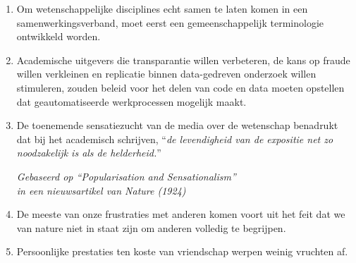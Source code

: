 \documentclass[a5paper]{article}
\begin{document}
\begin{enumerate}
\item Om wetenschappelijke disciplines echt samen te laten komen in een samenwerkingsverband, moet eerst een gemeenschappelijk terminologie ontwikkeld worden.

\item Academische uitgevers die transparantie willen verbeteren, de kans op fraude willen verkleinen en replicatie binnen data-gedreven onderzoek willen stimuleren, zouden beleid voor het delen van code en data moeten opstellen dat geautomatiseerde werkprocessen mogelijk maakt.

\item De toenemende sensatiezucht van de media over de wetenschap benadrukt dat bij het academisch schrijven, ``\textit{de levendigheid van de expositie net zo noodzakelijk is als de helderheid.}''
\begin{flushright}
  \vspace{-1.75mm}
  \textit{Gebaseerd op ``Popularisation and Sensationalism''\\ in een nieuwsartikel van Nature (1924)}
  \vspace{-1mm}
  \end{flushright}  

\item De meeste van onze frustraties met anderen komen voort uit het feit dat we van nature niet in staat zijn om anderen volledig te begrijpen.


\item Persoonlijke prestaties ten koste van vriendschap werpen weinig vruchten af.

\end{enumerate}
\end{document}
